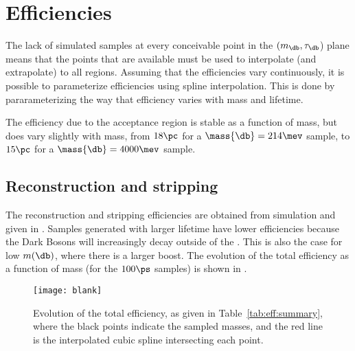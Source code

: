 \section{Efficiencies}
\label{sec:eff}

The lack of simulated samples at every conceivable point in the $(m_\db, \tau_\db$) plane means
that the points that are available must be used to interpolate (and extrapolate) to all regions.
Assuming that the efficiencies vary continuously, it is possible to parameterize efficiencies using
spline interpolation.
This is done by pararameterizing the way that efficiency varies with mass and lifetime.

The efficiency due to the \lhcb acceptance region is stable as a function of mass, but does vary
slightly with mass, from \approx$18\pc$ for a $\mass{\db}=214\mev$ sample, to \approx$15\pc$ for a
$\mass{\db}=4000\mev$ sample.


\subsection{Reconstruction and stripping}
The reconstruction and stripping efficiencies are obtained from simulation and given in
.
Samples generated with larger lifetime have lower efficiencies because the Dark
Bosons will increasingly decay outside of the \velo.
This is also the case for low $m(\db)$, where there is a larger boost.
The evolution of the total efficiency as a function of mass (for the $100\ps$ samples) is shown in
.






\begin{figure}
  \begin{center}
    \texttt{[image: blank]}
    \caption{
      Evolution of the total efficiency, as given in Table~\protect\ref{tab:eff:summary}, where the
      black points indicate the sampled masses, and the red line is the interpolated cubic spline
      intersecting each point.
    }
    \label{fig:eff:spline}
  \end{center}
\end{figure}

